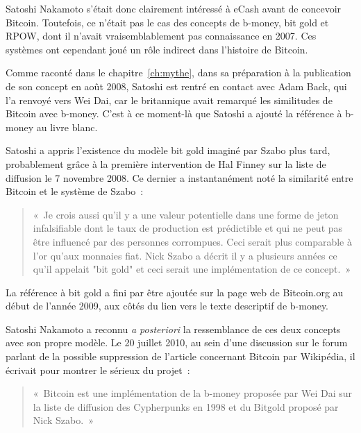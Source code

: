 Satoshi Nakamoto s'était donc clairement intéressé à eCash avant de concevoir Bitcoin. Toutefois, ce n'était pas le cas des concepts de b-money, bit gold et RPOW, dont il n'avait vraisemblablement pas connaissance en 2007. Ces systèmes ont cependant joué un rôle indirect dans l'histoire de Bitcoin.

Comme raconté dans le chapitre~\ref{ch:mythe}, dans sa préparation à la publication de son concept en août 2008, Satoshi est rentré en contact avec Adam Back, qui l'a renvoyé vers Wei Dai, car le britannique avait remarqué les similitudes de Bitcoin avec b-money. C'est à ce moment-là que Satoshi a ajouté la référence à b-money au livre blanc.

Satoshi a appris l'existence du modèle bit gold imaginé par Szabo plus tard, probablement grâce à la première intervention de Hal Finney sur la liste de diffusion le 7 novembre 2008. Ce dernier a instantanément noté la similarité entre Bitcoin et le système de Szabo~:

\begin{quote}
«~Je crois aussi qu'il y a une valeur potentielle dans une forme de jeton infalsifiable dont le taux de production est prédictible et qui ne peut pas être influencé par des personnes corrompues. Ceci serait plus comparable à l'or qu'aux monnaies fiat. Nick Szabo a décrit il y a plusieurs années ce qu'il appelait "bit gold" et ceci serait une implémentation de ce concept.~»
\end{quote}

La référence à bit gold a fini par être ajoutée sur la page web de Bitcoin.org au début de l'année 2009, aux côtés du lien vers le texte descriptif de b-money.

Satoshi Nakamoto a reconnu \emph{a posteriori} la ressemblance de ces deux concepts avec son propre modèle. Le 20 juillet 2010, au sein d'une discussion sur le forum parlant de la possible suppression de l'article concernant Bitcoin par Wikipédia, il écrivait pour montrer le sérieux du projet~:

\begin{quote}
«~Bitcoin est une implémentation de la b-money proposée par Wei Dai sur la liste de diffusion des Cypherpunks en 1998 et du Bitgold proposé par Nick Szabo.~»
\end{quote}

